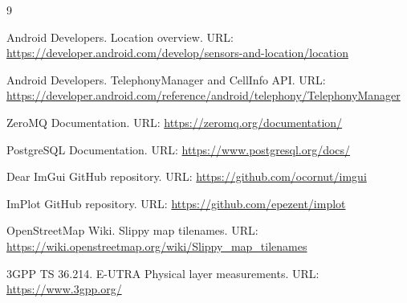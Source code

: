 \documentclass[14pt,a4paper]{extarticle}
\begin{document}
\newpage
\begin{thebibliography}{9}

Android Developers. Location overview. URL: \url{https://developer.android.com/develop/sensors-and-location/location}

Android Developers. TelephonyManager and CellInfo API. URL: \url{https://developer.android.com/reference/android/telephony/TelephonyManager}

ZeroMQ Documentation. URL: \url{https://zeromq.org/documentation/}

PostgreSQL Documentation. URL: \url{https://www.postgresql.org/docs/}

Dear ImGui GitHub repository. URL: \url{https://github.com/ocornut/imgui}

ImPlot GitHub repository. URL: \url{https://github.com/epezent/implot}

OpenStreetMap Wiki. Slippy map tilenames. URL: \url{https://wiki.openstreetmap.org/wiki/Slippy_map_tilenames}

3GPP TS 36.214. E-UTRA Physical layer measurements. URL: \url{https://www.3gpp.org/}

\end{thebibliography}
\end{document}
